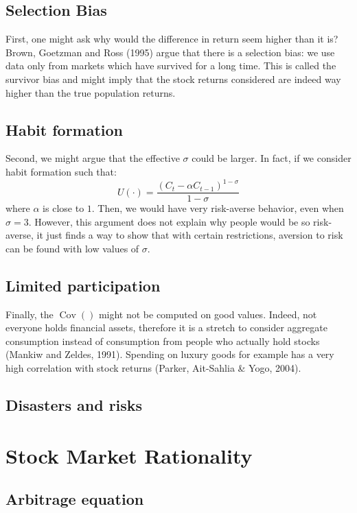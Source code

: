 \documentclass[12pt]{report}
\newcommand{\cov}[1]{\operatorname{Cov}\left(#1\right)}
\begin{document}
\subsection{Selection Bias}

First, one might ask why would the difference in return seem higher than it is? Brown, Goetzman and Ross (1995) argue that there is a selection bias: we use data only from markets which have survived for a long time. This is called the survivor bias and might imply that the stock returns considered are indeed way higher than the true population returns.

\subsection{Habit formation}

Second, we might argue that the effective $\sigma$ could be larger. In fact, if we consider habit formation such that: $$U(\cdot) = \frac{(C_t - \alpha C_{t-1})^{1-\sigma}}{1 - \sigma} $$ where $\alpha$ is close to $1$. Then, we would have very risk-averse behavior, even when $\sigma = 3$. However, this argument does not explain why people would be so risk-averse, it just finds a way to show that with certain restrictions, aversion to risk can be found with low values of $\sigma$.

\subsection{Limited participation}

Finally, the $\cov{}$ might not be computed on good values. Indeed, not everyone holds financial assets, therefore it is a stretch to consider aggregate consumption instead of consumption from people who actually hold stocks (Mankiw and Zeldes, 1991). Spending on luxury goods for example has a very high correlation with stock returns (Parker, Ait-Sahlia \& Yogo, 2004).

\subsection{Disasters and risks}



\section{Stock Market Rationality}

\subsection{Arbitrage equation}
\end{document}

